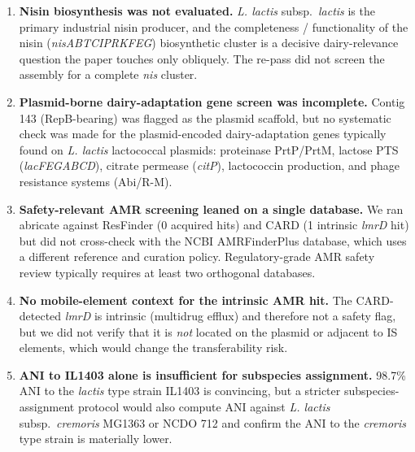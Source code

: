 \documentclass[11pt,letterpaper]{article}
\begin{document}
\begin{enumerate}[leftmargin=1.4em]
\item \textbf{Nisin biosynthesis was not evaluated.} \emph{L. lactis}
subsp.\ \emph{lactis} is the primary industrial nisin producer, and
the completeness / functionality of the nisin (\emph{nisABTCIPRKFEG})
biosynthetic cluster is a decisive dairy-relevance question the paper
touches only obliquely. The re-pass did not screen the assembly
for a complete \emph{nis} cluster.
\item \textbf{Plasmid-borne dairy-adaptation gene screen was
incomplete.} Contig 143 (RepB-bearing) was flagged as the plasmid
scaffold, but no systematic check was made for the plasmid-encoded
dairy-adaptation genes typically found on \emph{L. lactis} lactococcal
plasmids: proteinase PrtP/PrtM, lactose PTS (\emph{lacFEGABCD}),
citrate permease (\emph{citP}), lactococcin production, and phage
resistance systems (Abi/R-M).
\item \textbf{Safety-relevant AMR screening leaned on a single
database.} We ran abricate against ResFinder (0 acquired hits) and
CARD (1 intrinsic \emph{lmrD} hit) but did not cross-check with the
NCBI AMRFinderPlus database, which uses a different reference and
curation policy. Regulatory-grade AMR safety review typically
requires at least two orthogonal databases.
\item \textbf{No mobile-element context for the intrinsic AMR hit.}
The CARD-detected \emph{lmrD} is intrinsic (multidrug efflux) and
therefore not a safety flag, but we did not verify that it is
\emph{not} located on the plasmid or adjacent to IS elements, which
would change the transferability risk.
\item \textbf{ANI to IL1403 alone is insufficient for subspecies
assignment.} 98.7\% ANI to the \emph{lactis} type strain IL1403 is
convincing, but a stricter subspecies-assignment protocol would also
compute ANI against \emph{L. lactis} subsp.\ \emph{cremoris}
MG1363 or NCDO 712 and confirm the ANI to the \emph{cremoris}
type strain is materially lower.
\end{enumerate}
\end{document}
